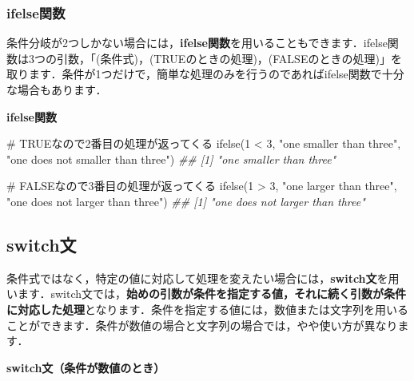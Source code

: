 \documentclass[
  letterpaper,
  DIV=11,
  numbers=noendperiod]{scrreprt}
\newenvironment{Shaded}{\begin{snugshade}}{\end{snugshade}}
\newcommand{\CommentTok}[1]{\textcolor[rgb]{0.37,0.37,0.37}{#1}}
\newcommand{\DecValTok}[1]{\textcolor[rgb]{0.68,0.00,0.00}{#1}}
\newcommand{\DocumentationTok}[1]{\textcolor[rgb]{0.37,0.37,0.37}{\textit{#1}}}
\newcommand{\FunctionTok}[1]{\textcolor[rgb]{0.28,0.35,0.67}{#1}}
\newcommand{\NormalTok}[1]{\textcolor[rgb]{0.00,0.23,0.31}{#1}}
\newcommand{\SpecialCharTok}[1]{\textcolor[rgb]{0.37,0.37,0.37}{#1}}
\newcommand{\StringTok}[1]{\textcolor[rgb]{0.13,0.47,0.30}{#1}}
\begin{document}
\hypertarget{ifelseux95a2ux6570}{%
\subsubsection{ifelse関数}\label{ifelseux95a2ux6570}}

条件分岐が2つしかない場合には，\textbf{ifelse関数}を用いることもできます．ifelse関数は3つの引数，「(条件式)，(TRUEのときの処理)，(FALSEのときの処理)」を取ります．条件が1つだけで，簡単な処理のみを行うのであればifelse関数で十分な場合もあります．

\textbf{ifelse関数}

\begin{Shaded}
\begin{Highlighting}[]
\CommentTok{\# TRUEなので2番目の処理が返ってくる}
\FunctionTok{ifelse}\NormalTok{(}\DecValTok{1} \SpecialCharTok{\textless{}} \DecValTok{3}\NormalTok{, }\StringTok{"one smaller than three"}\NormalTok{, }\StringTok{"one does not smaller than three"}\NormalTok{)}
\DocumentationTok{\#\# [1] "one smaller than three"}

\CommentTok{\# FALSEなので3番目の処理が返ってくる}
\FunctionTok{ifelse}\NormalTok{(}\DecValTok{1} \SpecialCharTok{\textgreater{}} \DecValTok{3}\NormalTok{, }\StringTok{"one larger than three"}\NormalTok{, }\StringTok{"one does not larger than three"}\NormalTok{) }
\DocumentationTok{\#\# [1] "one does not larger than three"}
\end{Highlighting}
\end{Shaded}

\hypertarget{switchux6587}{%
\subsection{switch文}\label{switchux6587}}

条件式ではなく，特定の値に対応して処理を変えたい場合には，\textbf{switch文}を用います．switch文では，\textbf{始めの引数が条件を指定する値，それに続く引数が条件に対応した処理}となります．条件を指定する値には，数値または文字列を用いることができます．条件が数値の場合と文字列の場合では，やや使い方が異なります．

\textbf{switch文（条件が数値のとき）}
\end{document}
